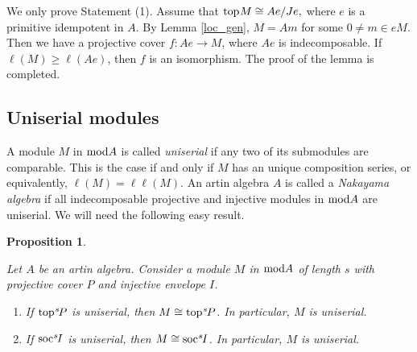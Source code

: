 \documentclass[10pt]{amsart}
\newtheorem{Prop}[Theo]{Proposition}
\newtheorem{Lemma}[Theo]{Lemma}
\theoremstyle{definition}
\newcommand{\mmod}{{\rm mod}}
\newcommand{\rad}{{\rm rad}\hspace{.5pt}}
\newcommand{\soc}{{\rm soc}\hspace{.5pt}}
\newcommand{\ntop}{{\rm top}\hspace{.5pt}}
\begin{document}
\vspace{-2.5pt}

 We only prove Statement (1). Assume that $\ntop M\cong Ae/Je,$ where $e$ is a primitive idempotent in $A$. By Lemma \ref{loc_gen}, $M=Am$ for some $0\ne m\in eM$. Then we have a projective cover $f: Ae\to M$, where $Ae$ is indecompo\-sable. If $\ell(M)\ge \ell(Ae)$, then $f$ is an isomorphism. The proof of the lemma is completed.


\vspace{-2pt}

\subsection{\sc Uniserial modules} A module $M$ in $\mmod A$ is called {\it uniserial} if any two of its submodules are comparable. This is the case if and only if $M$ has an unique composition series, or equivalently, $\ell(M)=\ell\ell(M)$. An artin algebra $A$ is called a {\it Nakayama algebra} if all indecomposable projective and injective modules in $\mmod A$ are uniserial. We will need the following easy result.

\begin{Prop}\label{uni_pi}

Let $A$ be an artin algebra. Consider a module $M$ in $\mmod A$ of length $s$ with projective cover $P$ and injective envelope $I$. 

\begin{enumerate}[$(1)$]

\vspace{-2pt}

\item If $\ntop^s\hspace{-1.2pt}P$ is uniserial, then $M\cong \ntop^s\hspace{-1pt}P$. In particular, $M$ is uniserial.

\item If $\soc^s\hspace{-1.2pt}I$ is uniserial, then $M\cong \soc^s\hspace{-1pt}I$. In particular, $M$ is uniserial.

\end{enumerate}\end{Prop}
\end{document}

